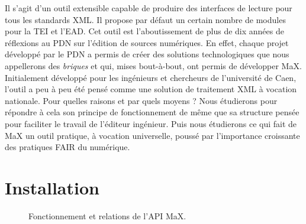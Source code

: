 \documentclass[a4paper,12pt,twoside]{book}
\begin{document}
Il s'agit d'un outil extensible capable de produire des interfaces de lecture pour tous les standards \acrshort{XML}. Il propose par défaut un certain nombre de modules pour la \acrshort{TEI} et l'EAD. Cet outil est l'aboutissement de plus de dix années de réflexions au \acrshort{PDN} sur l'édition de sources numériques. En effet, chaque projet développé par le \acrshort{PDN} a permis de créer des solutions technologiques que nous appellerons des \textit{briques} et qui, mises bout-à-bout, ont permis de développer MaX. Initialement développé pour les ingénieurs et chercheurs de l'université de Caen, l'outil a peu à peu été pensé comme une solution de traitement XML à vocation nationale. Pour quelles raisons et par quels moyens ? Nous étudierons pour répondre à cela son principe de fonctionnement de même que sa structure pensée pour faciliter le travail de l'éditeur ingénieur. Puis nous étudierons ce qui fait de MaX un outil pratique, à vocation universelle, poussé par l'importance croissante des pratiques FAIR du numérique.

\section{Installation}

\begin{figure}[H]
    \centering
    \caption[Fonctionnement et relations de l'API MaX]{Fonctionnement et relations de l'API MaX\footnotemark.}
    \label{max}
\end{figure}
\end{document}
